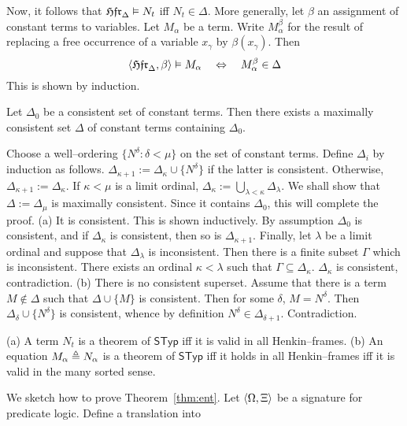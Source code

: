 Now, it follows that $\mathfrak{Hfr}_{\Delta} \vDash N_t$ iff
$N_t \in \Delta$. More generally, let $\beta$ an assignment of
constant terms to variables. Let $M_{\alpha}$ be a term. Write
$M^{\beta}_{\alpha}$ for the result of replacing a free occurrence
of a variable $x_{\gamma}$ by $\beta(x_{\gamma})$. Then
\begin{equation}
\langle \mathfrak{Hfr}_{\Delta}, \beta\rangle \vDash M_{\alpha}
\quad\Leftrightarrow\quad M^{\beta}_{\alpha} \in \Delta
\end{equation}
This is shown by induction.
\begin{lem}
\label{lem:wohl}
Let $\Delta_0$ be a consistent set of constant terms. Then there
exists a maximally consistent set $\Delta$ of constant terms
containing $\Delta_0$.
\end{lem}
\proofbeg%
Choose a well--ordering $\{N^{\delta} : \delta < \mu\}$ on the set
of constant terms. Define $\Delta_i$ by induction as follows.
$\Delta_{\kappa+1} := \Delta_{\kappa} \cup \{N^{\delta}\}$ if the
latter is consistent. Otherwise, $\Delta_{\kappa+1} :=
\Delta_{\kappa}$. If $\kappa < \mu$ is a limit ordinal,
$\Delta_{\kappa} := \bigcup_{\lambda < \kappa} \Delta_{\lambda}$.
We shall show that $\Delta := \Delta_{\mu}$ is maximally
consistent. Since it contains $\Delta_0$, this will complete the
proof. (a) It is consistent. This is shown inductively. By
assumption $\Delta_0$ is consistent, and if $\Delta_{\kappa}$ is
consistent, then so is $\Delta_{\kappa+1}$. Finally, let $\lambda$
be a limit ordinal and suppose that $\Delta_{\lambda}$ is
inconsistent. Then there is a finite subset $\Gamma$ which is
inconsistent. There exists an ordinal $\kappa < \lambda$ such that
$\Gamma \subseteq \Delta_{\kappa}$. $\Delta_{\kappa}$ is
consistent, contradiction. (b) There is no consistent superset.
Assume that there is a term $M \not\in \Delta$ such that $\Delta
\cup \{M\}$ is consistent. Then for some $\delta$, $M =
N^{\delta}$. Then $\Delta_{\delta} \cup \{N^{\delta}\}$ is
consistent, whence by definition
$N^{\delta} \in \Delta_{\delta+1}$. Contradiction. %
\proofend
\begin{thm}[Henkin]
(a) A term $N_t$ is a theorem of $\mathsf{STyp}$ iff it is
valid in all Henkin--frames. (b) An equation $M_{\alpha} \triangleq
N_{\alpha}$ is a theorem of $\mathsf{STyp}$ iff it holds in
all Henkin--frames iff it is valid in the many sorted 
sense.
\end{thm}
We sketch how to prove Theorem~\ref{thm:ent}. Let $\langle \Omega, \Xi\rangle$ 
be a signature for predicate logic. Define a translation into 
